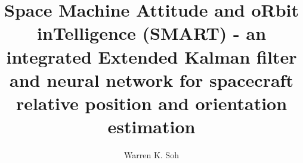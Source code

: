 \documentclass[12pt]{dalthesis}
\begin{document}
\title{Space Machine Attitude and oRbit inTelligence (SMART) -  an integrated Extended Kalman filter and neural network for spacecraft relative position and orientation estimation}
\author{Warren K. Soh}


\setcounter{lofdepth}{2}
\frontmatter   


%
%

%


%


%
\end{document}
